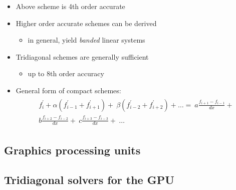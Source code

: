 \begin{frame}
    \begin{itemize}
    \item Above scheme is 4th order accurate
    \item Higher order accurate schemes can be derived
        \begin{itemize}
            \item in general, yield \emph{banded} linear systems
        \end{itemize}
    \item Tridiagonal schemes are generally sufficient
        \begin{itemize}
            \item up to 8th order accuracy
        \end{itemize}
    \item {General form of compact schemes:
    \begin{align*}
        \begin{split}
            f_i^{\prime} + \alpha(f^{\prime}_{i-1} + f^{\prime}_{i+1}) + \
            \beta(f^{\prime}_{i-2} + f^{\prime}_{i+2}) + \hdots  = \
            a\frac{f_{i+1} - f_{i-1}}{dx} + \\
            b\frac{f_{i+2} - f_{i-2}}{dx} + \
            c\frac{f_{i+3} - f_{i-3}}{dx} + \
            \hdots
        \end{split}
    \end{align*}}
    \end{itemize}
\end{frame}

\subsection{Graphics processing units}

\subsection{Tridiagonal solvers for the GPU}
\subsection{}

